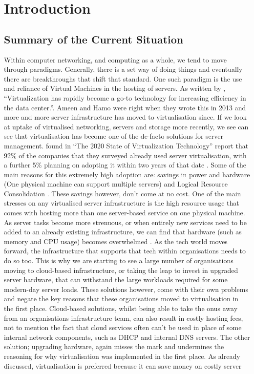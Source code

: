 
\chapter{Introduction}
\section{Summary of the Current Situation}
\label{CurrentSituation}
Within computer networking, and computing as a whole, we tend to move through paradigms. Generally, there is a set way of doing things and eventually there are breakthroughs that shift that standard. One such paradigm is the use and reliance of Virtual Machines in the hosting of servers. As written by \citet{VirtualNetworkingInTheFuture}, ``Virtualization has rapidly become a go-to technology for increasing efficiency in the data center.''. Ameen and Hamo were right when they wrote this in 2013 and more and more server infrastructure has moved to virtualisation since. If we look at uptake of virtualised networking, servers and storage more recently, we see can see that virtualisation has become one of the de-facto solutions for server management. \citet{Spiceworks} found in ``The 2020 State of Virtualization Technology'' report that 92\% of the companies that they surveyed already used server virtualisation, with a further 5\%  planning on adopting it within two years of that date \citep{Spiceworks}. Some of the main reasons for this extremely high adoption are: savings in power and hardware (One physical machine can support multiple servers) and Logical Resource Consolidation \citep{LetsGetVirtual}. These savings however, don't come at no cost. One of the main stresses on any virtualised server infrastructure is the high resource usage that comes with hosting more than one server-based service on one physical machine. As server tasks become more strenuous, or when entirely new services need to be added to an already existing infrastructure, we can find that hardware (such as memory and CPU usage) becomes overwhelmed \citep{LetsGetVirtual}. As the tech world moves forward, the infrastructure that supports that tech within organisations needs to do so too. This is why we are starting to see a large number of organisations moving to cloud-based infrastructure, or taking the leap to invest in upgraded server hardware, that can withstand the large workloads required for some modern-day server loads. These solutions however, come with their own problems and negate the key reasons that these organisations moved to virtualisation in the first place. Cloud-based solutions, whilst being able to take the onus away from an organisations infrastructure team, can also result in costly hosting fees, not to mention the fact that cloud services often can't be used in place of some internal network components, such as DHCP and internal DNS servers. The other solution; upgrading hardware, again misses the mark and undermines the reasoning for why virtualisation was implemented in the first place. As already discussed, virtualisation is preferred because it can save money on costly server 
